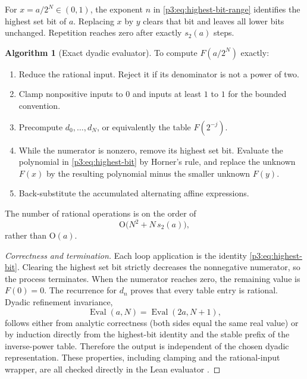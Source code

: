 \documentclass[11pt]{article}
\numberwithin{equation}{section}
\theoremstyle{definition}
\newtheorem{algorithm}[theorem]{Algorithm}
\theoremstyle{remark}
\newcommand{\Oh}{\mathrm O}
\begin{document}
For $x=a/2^N\in(0,1)$, the exponent $n$ in \eqref{p3:eq:highest-bit-range} identifies the highest set bit of $a$.  Replacing $x$ by $y$ clears that bit and leaves all lower bits unchanged.  Repetition reaches zero after exactly $s_2(a)$ steps.

\begin{algorithm}[Exact dyadic evaluator]\label{p3:alg:dyadic-evaluator}
To compute $F(a/2^N)$ exactly:
\begin{enumerate}
\item Reduce the rational input.  Reject it if its denominator is not a power of two.
\item Clamp nonpositive inputs to $0$ and inputs at least $1$ to $1$ for the bounded convention.
\item Precompute $d_0,\ldots,d_N$, or equivalently the table $F(2^{-j})$.
\item While the numerator is nonzero, remove its highest set bit.  Evaluate the polynomial in \eqref{p3:eq:highest-bit} by Horner's rule, and replace the unknown $F(x)$ by the resulting polynomial minus the smaller unknown $F(y)$.
\item Back-substitute the accumulated alternating affine expressions.
\end{enumerate}
The number of rational operations is on the order of
\begin{equation}\label{p3:eq:dyadic-complexity}
 \Oh\bigl(N^2+N\,s_2(a)\bigr),
\end{equation}
rather than $\Oh(a)$.
\end{algorithm}

\begin{proof}[Correctness and termination]
Each loop application is the identity \eqref{p3:eq:highest-bit}.  Clearing the highest set bit strictly decreases the nonnegative numerator, so the process terminates.  When the numerator reaches zero, the remaining value is $F(0)=0$.  The recurrence for $d_n$ proves that every table entry is rational.  Dyadic refinement invariance,
\[
 \operatorname{Eval}(a,N)=\operatorname{Eval}(2a,N+1),
\]
follows either from analytic correctness (both sides equal the same real value) or by induction directly from the highest-bit identity and the stable prefix of the inverse-power table.  Therefore the output is independent of the chosen dyadic representation.  These properties, including clamping and the rational-input wrapper, are all checked directly in the Lean evaluator \cite{p3:ProveIt}.
\end{proof}
\end{document}

